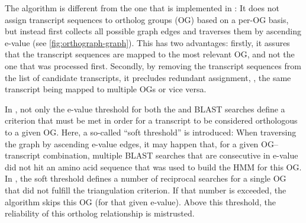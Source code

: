 The \pname algorithm is different from the one that is implemented in \hamstr:
It does not assign transcript sequences to ortholog groups (OG) based on a
per-OG basis, but instead first collects all possible graph edges  and traverses
them by ascending  e-value (see \autoref{fig:orthograph-graph}).
This has two advantages: firstly, it assures that the transcript sequences are
mapped to the most relevant OG, and not the one that was processed first.
Secondly, by removing the transcript sequences from the list of candidate
transcripts, it precludes redundant assignment, \ie, the same transcript being
mapped to multiple OGs or vice versa.

In \pname, not only the e-value threshold for both the  and BLAST
searches define a criterion that must be met in order for a transcript to be
considered orthologous to a given OG. Here, a so-called ``soft threshold'' is
introduced: When traversing the graph by ascending  e-value edges, it
may happen that, for a given OG--transcript combination, multiple BLAST searches
that are consecutive in e-value did not hit an amino acid sequence that was used
to build the HMM for this OG. In \pname, the soft threshold defines a number of
reciprocal searches for a single OG that did not fulfill the triangulation
criterion. If that number is exceeded, the algorithm skips this OG (for that
given  e-value). Above this threshold, the reliability of this ortholog
relationship is mistrusted.
